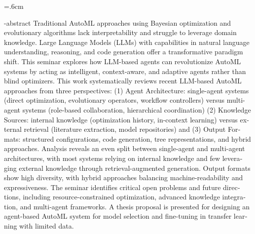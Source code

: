 
\baselineskip=.6cm
\begin{latin}
\en-abstract{
    Traditional AutoML approaches using Bayesian optimization and evolutionary algorithms lack interpretability and struggle to leverage domain knowledge. Large Language Models (LLMs) with capabilities in natural language understanding, reasoning, and code generation offer a transformative paradigm shift. This seminar explores how LLM-based agents can revolutionize AutoML systems by acting as intelligent, context-aware, and adaptive agents rather than blind optimizers. This work systematically reviews recent LLM-based AutoML approaches from three perspectives: (1) Agent Architecture: single-agent systems (direct optimization, evolutionary operators, workflow controllers) versus multi-agent systems (role-based collaboration, hierarchical coordination) (2) Knowledge Sources: internal knowledge (optimization history, in-context learning) versus external retrieval (literature extraction, model repositories) and (3) Output Formats: structured configurations, code generation, tree representations, and hybrid approaches. Analysis reveals an even split between single-agent and multi-agent architectures, with most systems relying on internal knowledge and few leveraging external knowledge through retrieval-augmented generation. Output formats show high diversity, with hybrid approaches balancing machine-readability and expressiveness. The seminar identifies critical open problems and future directions, including resource-constrained optimization, advanced knowledge integration, and multi-agent frameworks. A thesis proposal is presented for designing an agent-based AutoML system for model selection and fine-tuning in transfer learning with limited data.
}
\latinfirstPage
\end{latin}
